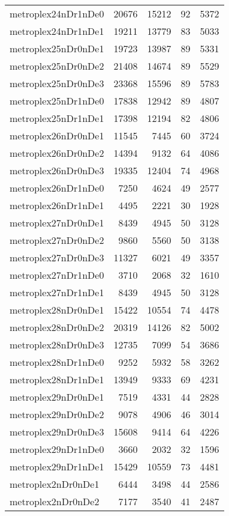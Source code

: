\begin{longtable}{lrrrr}
metroplex24nDr1nDe0 & 20676 & 15212 & 92 & 5372 \\
metroplex24nDr1nDe1 & 19211 & 13779 & 83 & 5033 \\
metroplex25nDr0nDe1 & 19723 & 13987 & 89 & 5331 \\
metroplex25nDr0nDe2 & 21408 & 14674 & 89 & 5529 \\
metroplex25nDr0nDe3 & 23368 & 15596 & 89 & 5783 \\
metroplex25nDr1nDe0 & 17838 & 12942 & 89 & 4807 \\
metroplex25nDr1nDe1 & 17398 & 12194 & 82 & 4806 \\
metroplex26nDr0nDe1 & 11545 & 7445 & 60 & 3724 \\
metroplex26nDr0nDe2 & 14394 & 9132 & 64 & 4086 \\
metroplex26nDr0nDe3 & 19335 & 12404 & 74 & 4968 \\
metroplex26nDr1nDe0 & 7250 & 4624 & 49 & 2577 \\
metroplex26nDr1nDe1 & 4495 & 2221 & 30 & 1928 \\
metroplex27nDr0nDe1 & 8439 & 4945 & 50 & 3128 \\
metroplex27nDr0nDe2 & 9860 & 5560 & 50 & 3138 \\
metroplex27nDr0nDe3 & 11327 & 6021 & 49 & 3357 \\
metroplex27nDr1nDe0 & 3710 & 2068 & 32 & 1610 \\
metroplex27nDr1nDe1 & 8439 & 4945 & 50 & 3128 \\
metroplex28nDr0nDe1 & 15422 & 10554 & 74 & 4478 \\
metroplex28nDr0nDe2 & 20319 & 14126 & 82 & 5002 \\
metroplex28nDr0nDe3 & 12735 & 7099 & 54 & 3686 \\
metroplex28nDr1nDe0 & 9252 & 5932 & 58 & 3262 \\
metroplex28nDr1nDe1 & 13949 & 9333 & 69 & 4231 \\
metroplex29nDr0nDe1 & 7519 & 4331 & 44 & 2828 \\
metroplex29nDr0nDe2 & 9078 & 4906 & 46 & 3014 \\
metroplex29nDr0nDe3 & 15608 & 9414 & 64 & 4226 \\
metroplex29nDr1nDe0 & 3660 & 2032 & 32 & 1596 \\
metroplex29nDr1nDe1 & 15429 & 10559 & 73 & 4481 \\
metroplex2nDr0nDe1 & 6444 & 3498 & 44 & 2586 \\
metroplex2nDr0nDe2 & 7177 & 3540 & 41 & 2487 \\

\end{longtable}
